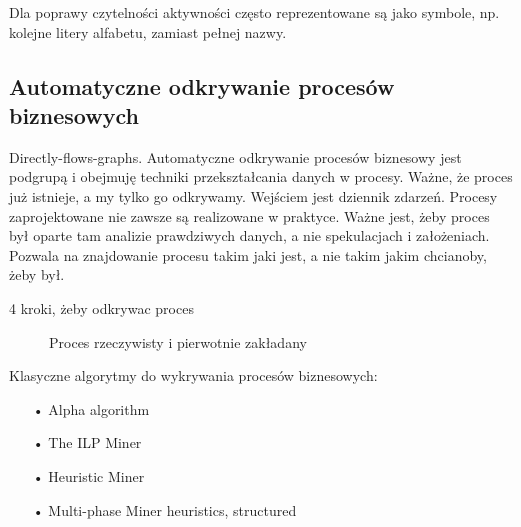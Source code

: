 Dla poprawy czytelności aktywności często reprezentowane są jako symbole, np. kolejne litery alfabetu, zamiast pełnej nazwy.

\subsection{Automatyczne odkrywanie procesów biznesowych}

Directly-flows-graphs.
Automatyczne odkrywanie procesów biznesowy jest podgrupą i obejmuję techniki przekształcania danych w procesy. Ważne, że proces już istnieje, a my tylko go odkrywamy. Wejściem jest dziennik zdarzeń.
Procesy zaprojektowane nie zawsze są realizowane w praktyce. Ważne jest, żeby proces był oparte tam analizie prawdziwych danych, a nie spekulacjach i założeniach. Pozwala na znajdowanie procesu takim jaki jest, a nie takim jakim chcianoby, żeby  był.


4 kroki, żeby odkrywac proces

\begin{figure}[h]
	\caption{\label{fig:subcaption_example}Proces rzeczywisty i pierwotnie zakładany}
\end{figure}

Klasyczne algorytmy do wykrywania procesów biznesowych:
\begin{itemize}
  \item[•] Alpha algorithm
  \item[•] The ILP Miner
  \item[•] Heuristic Miner 
  \item[•] Multi-phase Miner
  heuristics, structured
\end{itemize}

